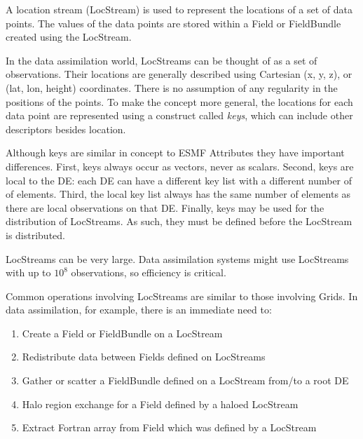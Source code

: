 %

A location stream (LocStream) is used to represent the locations of
a set of data points.  The values of the data points are stored within
a Field or FieldBundle created using the LocStream.

In the data assimilation world, LocStreams can
be thought of as a set of observations.  Their locations are generally
described using Cartesian (x, y, z), or (lat, lon, height) coordinates.
There is no assumption of any regularity in the positions of the points.
To make the concept more general, the locations for each data point are
represented using a construct called {\it keys}, which can include other
descriptors besides location.

Although keys are similar in concept to ESMF Attributes they have important
differences. First, keys always occur as vectors, never as scalars.
Second, keys are local to the DE: each DE can have a different key
list with a different number of of elements. Third, the local key 
list always has the same number of elements as there are local observations
on that DE.  Finally, keys may be used for the distribution of LocStreams.
As such, they must be defined before the LocStream is distributed.

LocStreams can be very large. Data assimilation systems might use
LocStreams with up to $10^{8}$ observations, so efficiency is critical.

Common operations involving LocStreams are similar to those involving Grids.
In data assimilation, for example, there is an immediate need to:

\begin{enumerate}
\item Create a Field or FieldBundle on a LocStream
\item Redistribute data between Fields defined on LocStreams
\item Gather or scatter a FieldBundle defined on a LocStream from/to a root DE
\item Halo region exchange for a Field defined by a haloed LocStream
\item Extract Fortran array from Field which was defined by a LocStream
\end{enumerate}

